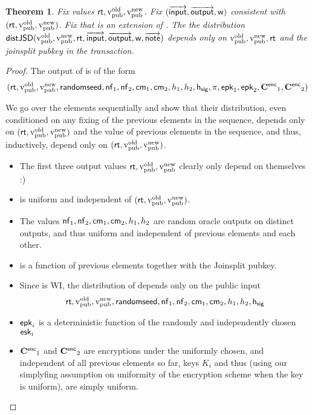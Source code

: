 \documentclass[11pt]{article}
\numberwithin{equation}{section} %
\numberwithin{figure}{section} %
\newtheorem{thm}{Theorem}[section]
\begin{document}
\begin{thm}\label{thm:privacy}
Fix values $\mathsf{rt},\mathrm{v_{pub}^{old}},\mathrm{v_{pub}^{new}}$.
Fix $(\overrightarrow{\mathsf{input}},\overrightarrow{\mathsf{output}},\mathsf{w})$ consistent with $(\mathsf{rt},\mathrm{v_{pub}^{old}},\mathrm{v_{pub}^{new}})$.
Fix \notes that is an extension of \outputs.
The the distribution $\mathsf{distJSD}(\mathrm{v_{pub}^{old}},\mathrm{v_{pub}^{new}},\mathsf{rt},\overrightarrow{\mathsf{input}},\overrightarrow{\mathsf{output}},\mathsf{w},\overrightarrow{\mathsf{note}})$
 depends only on $\mathrm{v_{pub}^{old}},\mathrm{v_{pub}^{new}},\mathsf{rt}$ and the joinsplit pubkey in the transaction.
\end{thm}
\begin{proof}
The output of \makejsd is of the form
\[(\mathsf{rt},\mathrm{v_{pub}^{old}},\mathrm{v_{pub}^{new}},\mathsf{randomseed},\mathsf{nf}_1,\mathsf{nf}_2,\mathsf{cm}_1,\mathsf{cm}_2,h_1,h_2,\mathsf{h_{sig}},\pi,\mathsf{epk}_1,\mathsf{epk}_2,\mathbf{C^{\mathsf{enc}}}_1,\mathbf{C^{\mathsf{enc}}}_2)\]

We go over the elements sequentially and show that their distribution, even conditioned on any fixing of the previous elements in the sequence,
depends only on $(\mathsf{rt},\mathrm{v_{pub}^{old}},\mathrm{v_{pub}^{new}})$ and the value of previous elements in the sequence, and thus, inductively, depend only on $(\mathsf{rt},\mathrm{v_{pub}^{old}},\mathrm{v_{pub}^{new}})$.
\begin{itemize}
 \item  The first three output values $\mathsf{rt},\mathrm{v_{pub}^{old}},\mathrm{v_{pub}^{new}}$ clearly only depend on themselves :)
\item  \randomseed is uniform and independent of $(\mathsf{rt},\mathrm{v_{pub}^{old}},\mathrm{v_{pub}^{new}})$.
\item  The values $\mathsf{nf}_1,\mathsf{nf}_2,\mathsf{cm}_1,\mathsf{cm}_2,h_1,h_2$ are random oracle outputs on distinct outputs, and thus uniform and independent of previous elements
and each other.
\item \hsig is a function of previous elements together with the Joinsplit pubkey.
\item Since \snark is WI, the distribution of \prf depends only on the public input 
\[\mathsf{rt},\mathrm{v_{pub}^{old}},\mathrm{v_{pub}^{new}},\mathsf{randomseed},\mathsf{nf}_1,\mathsf{nf}_2,\mathsf{cm}_1,\mathsf{cm}_2,h_1,h_2,\mathsf{h_{sig}}\]
\item $\mathsf{epk}_i$ is a deterministic function of the randomly and independently chosen $\mathsf{esk}_i$
 \item $\mathbf{C^{\mathsf{enc}}}_1$ and $\mathbf{C^{\mathsf{enc}}}_2$ are encryptions under the uniformly chosen, and independent of all previous elements so far, keys $K_i$ and thus (using our simplyfing assumption on uniformity of the encryption scheme when the key is uniform), are simply uniform.
\end{itemize}

\end{proof}












\end{document}
